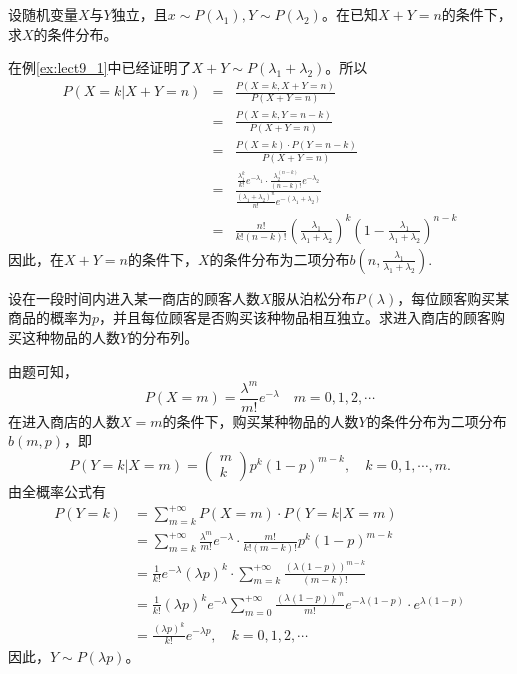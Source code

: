 \begin{example}
设随机变量$X$与$Y$独立，且$x \sim P\left(\lambda_{1}\right), Y \sim P\left(\lambda_{2}\right)$。在已知$X+Y=n$的条件下，求$X$的条件分布。
\end{example}
\begin{solution}
在例\ref{ex:lect9_1}中已经证明了$X+Y\sim P(\lambda_{1}+\lambda_{2})$。所以
\begin{eqnarray*}
P(X=k  |  X+Y=n)&=&\frac{P(X=k, X+Y=n)}{P(X+Y=n)}\\
&=&\frac{P(X=k, Y=n-k)}{P(X+Y=n)} \\
&=& \frac{P(X=k) \cdot P(Y=n-k)}{P(X+Y=n)}\\
&=&\frac{\frac{\lambda_{1}^{k}}{k !} e^{-\lambda_{1}} \cdot \frac{\lambda_{2}^{(n-k)}}{(n-k) !} e^{-\lambda_{2}}}{\frac{\left(\lambda_{1}+\lambda_{2}\right)^{n}}{n !} e^{-\left(\lambda_{1}+\lambda_{2}\right)}}\\
&=&\frac{n !}{k !(n-k) !}\left(\frac{\lambda_{1}}{\lambda_{1}+\lambda_{2}}\right)^{k}\left(1-\frac{\lambda_{1}}{\lambda_{1}+\lambda_{2}}\right)^{n-k}
\end{eqnarray*}
因此，在$X+Y=n$的条件下，$X$的条件分布为二项分布$b\left(n, \frac{\lambda_{1}}{\lambda_{1}+\lambda_{2}}\right).$
\end{solution}
\begin{example}
设在一段时间内进入某一商店的顾客人数$X$服从泊松分布$P(\lambda)$，每位顾客购买某商品的概率为$p$，并且每位顾客是否购买该种物品相互独立。求进入商店的顾客购买这种物品的人数$Y$的分布列。
\end{example}
\begin{solution}
由题可知，
$$P(X=m)=\frac{\lambda^{m}}{m !} e^{-\lambda} \quad m=0,1,2, \cdots$$
在进入商店的人数$X=m$的条件下，购买某种物品的人数$Y$的条件分布为二项分布$b(m,p)$，即
$$P(Y=k  |  X=m)=\begin{pmatrix}
m \\
k
\end{pmatrix} p^{k}(1-p)^{m-k}, \quad k=0,1, \cdots, m.$$
由全概率公式有$$\begin{aligned}
P(Y=k) &=\sum_{m=k}^{+\infty} P(X=m) \cdot P(Y=k  |  X=m) \\
&=\sum_{m=k}^{+\infty} \frac{\lambda^{m}}{m !} e^{-\lambda} \cdot \frac{m !}{k !(m-k) !} p^{k}(1-p)^{m-k} \\
&=\frac{1}{k !} e^{-\lambda}(\lambda p)^{k} \cdot \sum_{m=k}^{+\infty} \frac{(\lambda(1-p))^{m-k}}{(m-k) !} \\
&=\frac{1}{k !}(\lambda p)^{k} e^{-\lambda} \sum_{m=0}^{+\infty} \frac{(\lambda(1-p))^{m}}{m !} e^{-\lambda(1-p)} \cdot e^{\lambda(1-p)} \\
&=\frac{(\lambda p)^{k}}{k !} e^{-\lambda p} ,\quad k=0,1,2, \cdots
\end{aligned}$$
因此，$Y\sim P(\lambda p)$。
\end{solution}

